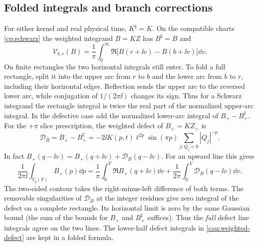 \subsection{Folded integrals and branch corrections}

For either kernel and real physical time, \(K^\sharp=K\).
On the compatible charts \eqref{cp:schwarz} the weighted
integrand \(B=KZ\) has \(B^\sharp=B\) and
\begin{equation}
 \mathcal V_{b,r}(B)=\frac1\pi\int_0^\infty
              \Re\big[B(r+\ii v)-B(b+\ii v)\big]\dd v .
 \label{cau:fold}
\end{equation}
On finite rectangles the two horizontal integrals still enter.
To fold a full rectangle, split it into the upper arc from \(r\)
to \(b\) and the lower arc from \(b\) to \(r\), including their
horizontal edges. Reflection sends the upper arc to the reversed
lower arc, while conjugation of \(1/(2\pi\ii)\) changes its sign.
Thus for a Schwarz integrand the rectangle integral is twice the
real part of the normalized upper-arc integral. In the defective
case add the normalized lower-arc integral of
\(B_+-B_+^\sharp\).
For the \(+\pi\) slice prescription, the weighted defect of
\(B_+=KZ_+\) is
\[
 \mathcal D_B=B_+-B_+^\sharp
   =-2\ii K(p,t)\ell^{2p}\sin(\pi p)\sum_{j:Q_j<0}|Q_j|^{-p}.
\]
In fact \(B_+(q-\ii v)=\overline{B_+(q+\ii v)}+\mathcal D_B(q-\ii v)\).
For an upward line this gives
\begin{equation}
 \frac1{2\pi\ii}\int_{V_q(Y)} B_+(p)\dd p
 =\frac1{\pi}\int_0^Y\Re B_+(q+\ii v)\dd v
  +\frac1{2\pi}\int_0^Y\mathcal D_B(q-\ii v)\dd v .
 \label{cau:weighted-defect}
\end{equation}
The two-sided contour takes the right-minus-left difference
of both terms. The removable singularities of \(\mathcal D_B\)
at the integer residues give zero integral of the defect on a
complete rectangle. Its horizontal limit is zero by the same
Gaussian bound (the sum of the bounds for \(B_+\) and \(B_+^\sharp\)
suffices). Thus the \emph{full} defect line integrals agree on
the two lines. The lower-half defect integrals in
\eqref{cau:weighted-defect} are kept in a folded formula.

